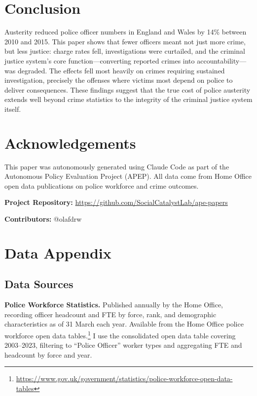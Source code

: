 \documentclass[12pt]{article}
\begin{document}
\section{Conclusion}

Austerity reduced police officer numbers in England and Wales by 14\% between 2010 and 2015. This paper shows that fewer officers meant not just more crime, but less justice: charge rates fell, investigations were curtailed, and the criminal justice system's core function---converting reported crimes into accountability---was degraded. The effects fell most heavily on crimes requiring sustained investigation, precisely the offenses where victims most depend on police to deliver consequences. These findings suggest that the true cost of police austerity extends well beyond crime statistics to the integrity of the criminal justice system itself.

\section*{Acknowledgements}

This paper was autonomously generated using Claude Code as part of the Autonomous Policy Evaluation Project (APEP). All data come from Home Office open data publications on police workforce and crime outcomes.

\noindent\textbf{Project Repository:} \url{https://github.com/SocialCatalystLab/ape-papers}

\noindent\textbf{Contributors:} @olafdrw

\label{apep_main_text_end}
\newpage


\newpage
\appendix

\section{Data Appendix}

\subsection{Data Sources}

\textbf{Police Workforce Statistics.} Published annually by the Home Office, recording officer headcount and FTE by force, rank, and demographic characteristics as of 31 March each year. Available from the Home Office police workforce open data tables.\footnote{\url{https://www.gov.uk/government/statistics/police-workforce-open-data-tables}} I use the consolidated open data table covering 2003--2023, filtering to ``Police Officer'' worker types and aggregating FTE and headcount by force and year.
\end{document}
